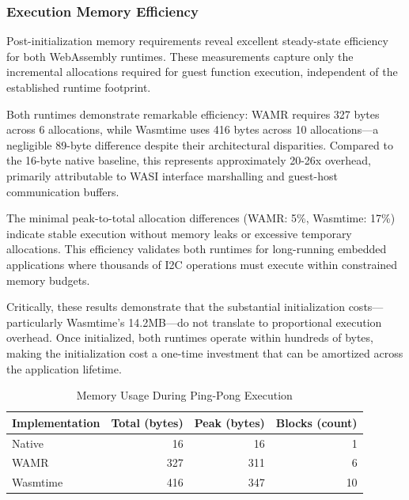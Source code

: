 
\subsubsection{Execution Memory Efficiency}

Post-initialization memory requirements reveal excellent steady-state efficiency for both WebAssembly runtimes. These measurements capture only the incremental allocations required for guest function execution, independent of the established runtime footprint.

Both runtimes demonstrate remarkable efficiency: WAMR requires 327 bytes across 6 allocations, while Wasmtime uses 416 bytes across 10 allocations—a negligible 89-byte difference despite their architectural disparities. Compared to the 16-byte native baseline, this represents approximately 20-26x overhead, primarily attributable to WASI interface marshalling and guest-host communication buffers.

The minimal peak-to-total allocation differences (WAMR: 5\%, Wasmtime: 17\%) indicate stable execution without memory leaks or excessive temporary allocations. This efficiency validates both runtimes for long-running embedded applications where thousands of I2C operations must execute within constrained memory budgets.

Critically, these results demonstrate that the substantial initialization costs—particularly Wasmtime's 14.2MB—do not translate to proportional execution overhead. Once initialized, both runtimes operate within hundreds of bytes, making the initialization cost a one-time investment that can be amortized across the application lifetime.

\begin{table}[htbp]
    \centering
    \caption{Memory Usage During Ping-Pong Execution}
    \label{tab:memory-execution}
    \begin{tabular}{lrrr}
        \toprule
        \textbf{Implementation} & \textbf{Total (bytes)} & \textbf{Peak (bytes)} & \textbf{Blocks (count)} \\
        \midrule
        Native        & 16   & 16  & 1 \\
        WAMR          & 327  & 311 & 6 \\
        Wasmtime      & 416  & 347 & 10 \\
        \bottomrule
    \end{tabular}
\end{table}

